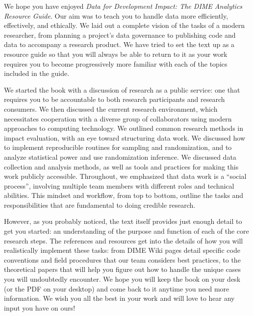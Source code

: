 We hope you have enjoyed \textit{Data for Development Impact: The DIME Analytics Resource Guide}.
Our aim was to teach you to handle data more efficiently, effectively, and ethically.
We laid out a complete vision of the tasks of a modern researcher,
from planning a project's data governance to publishing code and data
to accompany a research product.
We have tried to set the text up as a resource guide
so that you will always be able to return to it
as your work requires you to become progressively more familiar
with each of the topics included in the guide.

We started the book with a discussion of research as a public service:
one that requires you to be accountable to both research participants
and research consumers.
We then discussed the current research environment,
which necessitates cooperation with a diverse group of collaborators
using modern approaches to computing technology.
We outlined common research methods in impact evaluation,
with an eye toward structuring data work.
We discussed how to implement reproducible routines for sampling and randomization,
and to analyze statistical power and use randomization inference.
We discussed data collection
and analysis methods,
as well as tools and practices for making this work publicly accessible.
Throughout, we emphasized that data work is a ``social process'',
involving multiple team members with different roles and technical abilities.
This mindset and workflow, from top to bottom,
outline the tasks and responsibilities
that are fundamental to doing credible research.

However, as you probably noticed, the text itself provides
just enough detail to get you started:
an understanding of the purpose and function of each of the core research steps.
The references and resources get into the details
of how you will realistically implement these tasks:
from DIME Wiki pages detail specific code conventions
and field procedures that our team considers best practices,
to the theoretical papers that will help you figure out
how to handle the unique cases you will undoubtedly encounter.
We hope you will keep the book on your desk
(or the PDF on your desktop)
and come back to it anytime you need more information.
We wish you all the best in your work
and will love to hear any input you have on ours!
